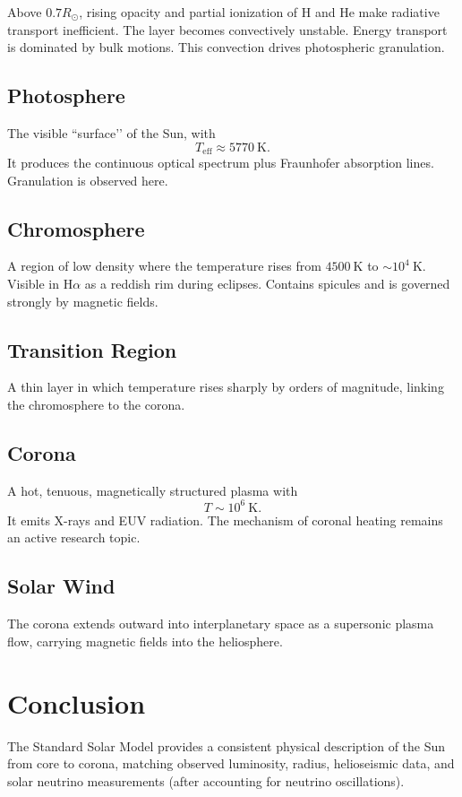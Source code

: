 \documentclass[12pt]{article}
\begin{document}
Above $0.7R_{\odot}$, rising opacity and partial ionization of H and He make
radiative transport inefficient.  The layer becomes convectively unstable.
Energy transport is dominated by bulk motions.  This convection drives
photospheric granulation.

\subsection*{Photosphere}

The visible ``surface’’ of the Sun, with
\[
T_{\mathrm{eff}} \approx 5770~\mathrm{K}.
\]
It produces the continuous optical spectrum plus Fraunhofer absorption lines.
Granulation is observed here.

\subsection*{Chromosphere}

A region of low density where the temperature rises from $4500~\mathrm{K}$ to
$\sim 10^{4}~\mathrm{K}$.  Visible in H$\alpha$ as a reddish rim during eclipses.
Contains spicules and is governed strongly by magnetic fields.

\subsection*{Transition Region}

A thin layer in which temperature rises sharply by orders of magnitude, linking
the chromosphere to the corona.

\subsection*{Corona}

A hot, tenuous, magnetically structured plasma with
\[
T \sim 10^{6}~\mathrm{K}.
\]
It emits X-rays and EUV radiation.  The mechanism of coronal heating remains an
active research topic.

\subsection*{Solar Wind}

The corona extends outward into interplanetary space as a supersonic plasma
flow, carrying magnetic fields into the heliosphere.

\section*{Conclusion}

The Standard Solar Model provides a consistent physical description of the Sun
from core to corona, matching observed luminosity, radius, helioseismic data,
and solar neutrino measurements (after accounting for neutrino oscillations).
\end{document}
